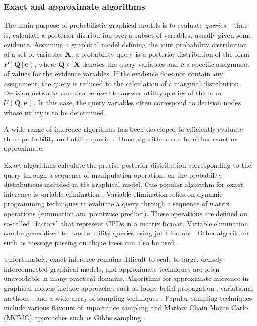 \subsubsection*{Exact and approximate algorithms}
The main purpose of probabilistic graphical models is to evaluate \textit{queries} -- that is, calculate a posterior distribution over a subset of variables, usually given some evidence. Assuming a graphical model defining the joint probability distribution of a set of variables $\mathbf{X}$, a probability query is a posterior distribution of the form $P(\mathbf{Q}  \, | \, \mathbf{e})$, where $\mathbf{Q} \subset \mathbf{X}$ denotes the query variables and $\mathbf{e}$ a specific assignment of values for the evidence variables.  If the evidence does not contain any assignment, the query is reduced to the calculation of a marginal distribution.  Decision networks can also be used to answer utility queries of the form $U(\mathbf{Q}, \mathbf{e})$.  In this case, the query variables often correspond to decision nodes whose utility is to be determined.

A wide range of inference algorithms has been developed to efficiently evaluate these probability and utility queries. These algorithms can be either exact or approximate.  

Exact algorithms
 calculate the precise posterior distribution corresponding to the query through a sequence of manipulation operations on the probability distributions included in the graphical model.  One popular algorithm for exact inference is variable elimination \citep{ZhangP96}.  Variable elimination relies on dynamic programming techniques to evaluate a query through a sequence of matrix operations (summation and pointwise product). These operations are defined on so-called ``factors'' that represent CPDs in a matrix format. Variable elimination can be generalised to handle utility queries using joint factors \citep{Koller+Friedman:09}.   Other algorithms such as message passing on clique trees can also be used \citep{jensen1990}. 

Unfortunately, exact inference remains difficult to scale to large, densely interconnected graphical models, and  approximate techniques are often unavoidable in many practical domains.  Algorithms for approximate inference
 in graphical models include approaches such as loopy belief propagation \citep{Murphy:1999}, variational methods \citep{Jordan:1999},  and a wide array of sampling techniques \citep{mackay1998introduction}. Popular sampling techniques include various flavours of importance sampling \citep{FungC89,cheng2000ais} and Markov Chain Monte Carlo (MCMC) approaches such as Gibbs sampling \citep{pearl1987evidential,gamerman2006markov}. %

